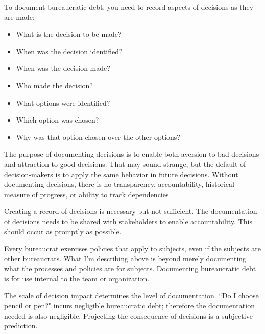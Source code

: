 To document bureaucratic debt, you need to record aspects of decisions as they are made:
\begin{itemize}
    \item What is the decision to be made?
    \item When was the decision  identified?
    \item When was the decision made?
    \item Who made the decision?
    \item What options were identified?
    \item Which option was chosen?
    \item Why was that option  chosen over the other options?
\end{itemize}
The purpose of documenting decisions is to enable both aversion to bad decisions and attraction to good decisions. That may sound strange, but the default of decision-makers is to apply the same behavior in future decisions. 
Without documenting decisions, there is no transparency, accountability, historical measure of progress, or ability to track dependencies. 

Creating a record of decisions is necessary but not sufficient. The documentation of decisions needs to be shared with stakeholders to enable accountability. This should occur as promptly as possible. 

Every bureaucrat exercises policies that apply to subjects, even if the subjects are other bureaucrats. What I'm describing above is beyond merely documenting what the processes and policies are for subjects. Documenting bureaucratic debt is for use internal to the team or organization.  

The scale of decision impact determines the level of documentation. ``Do I choose pencil or pen?" incurs negligible bureaucratic debt; therefore the documentation needed is also negligible. Projecting the consequence of decisions is a subjective prediction. 


